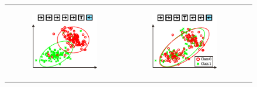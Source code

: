\documentclass[]{article}
\begin{document}
\begin{figure}[!ht]
\begin{tabular}{c|c|c}
\begin{subfigure}[t]{0.29\columnwidth}
\begin{center}
            \includegraphics[width=\columnwidth]{img/GM2}
            \caption{}
            \label{fig:GM2}
            \end{center}
        \end{subfigure}
        &
        \begin{subfigure}[t]{0.29\columnwidth}
            \begin{flushright}
            \includegraphics[width=\columnwidth]{img/GM3}
            \caption{}
            \label{fig:GM3}

\end{flushright}
\end{subfigure}
\end{tabular}
\end{figure}
\end{document}
